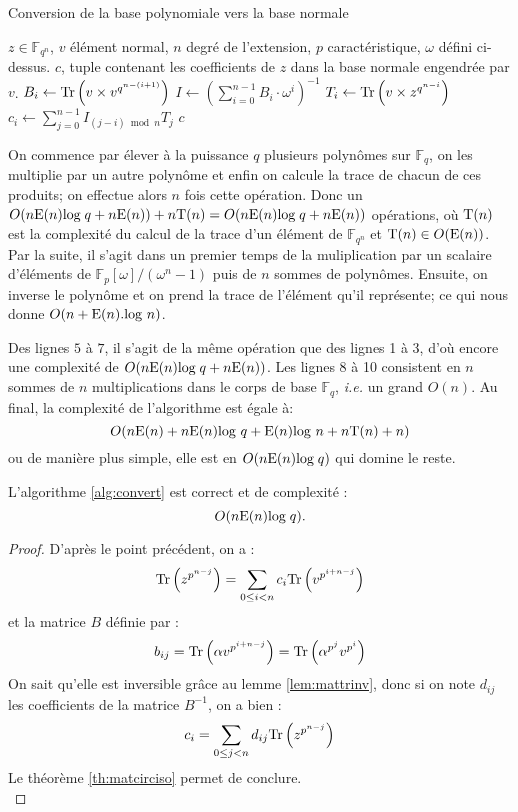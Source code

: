 \documentclass[a4paper]{article} %
\numberwithin{section}{part}
\numberwithin{equation}{section}
\newcommand\GF[1]{\mathbb{F}_{#1}}
\newcommand\Tr[1]{\textup{Tr}\left(#1\right)}
\newcommand\E[1]{\textup{E}(#1)}
\begin{document}
\begin{algorithm}
\caption{Conversion de la base polynomiale vers la base normale}
\label{alg:convert}
\begin{algorithmic}[1]
\REQUIRE $z\in\GF{q^n}$, $v$ élément normal, $n$ degré de l'extension, $p$ 
caractéristique, $\omega$ défini ci-dessus.
\ENSURE $c$, tuple contenant les coefficients de $z$ dans la base 
normale engendrée par $v$.
\bigskip
{}
    \STATE $B_i \leftarrow \Tr{v\times v^{q^{n-(i+1)}}}$
\ENDFOR
\STATE $I \leftarrow (\sum_{i = 0}^{n-1}{B_i\cdot \omega^i})^{-1}$
    \STATE $T_i \leftarrow \Tr{v\times z^{q^{n-i}}}$
\ENDFOR
{}
    \STATE $c_i \leftarrow \sum_{j=0}^{n-1}{I_{(j-i)\bmod n}T_j}$
\ENDFOR
\RETURN $c$

\end{algorithmic}
\end{algorithm}
On commence par élever à la puissance $q$ plusieurs polynômes sur $\GF{q}$, 
on les multiplie par un autre polynôme et enfin on calcule la trace de chacun 
de ces produits; on effectue alors $n$ fois cette opération. Donc un 
$O(n\E{n}\textup{log}\;q + n\E{n}) + n\textup{T}(n) = O(n\E{n}\textup{log}\;q + 
n\E{n})$ opérations, 
où $\textup{T}(n)$ est la complexité du calcul de la trace d'un élément
de $\GF{q^n}$ et $\textup{T}(n) \in O(\E{n})$.
Par la suite, il s'agit dans un premier temps de la muliplication par un 
scalaire d'éléments de $\mathbb{F}_p[\omega]/(\omega^n - 1)$ puis de $n$ sommes 
de polynômes. Ensuite, on inverse le polynôme et on prend la trace de l'élément 
qu'il représente; ce qui nous donne $O(n + \E{n}.\textup{log }n)$.\par
Des lignes $5$ à $7$, il s'agit de la même opération que des lignes 1 à 3, d'où 
encore une complexité de $O(n\E{n}\textup{log}\;q + n\E{n})$.
Les lignes 8 à 10 consistent en $n$ sommes de $n$ multiplications dans le corps 
de base $\GF{q}$, \textit{i.e.} un grand $O(n)$.
Au final, la complexité de l'algorithme est égale à:
\[O(n\E{n} + n\E{n}\textup{log }q +  \E{n}\textup{log }n + n\textup{T}(n) + n)\]
ou de manière plus simple, elle est en $O(n\E{n}\textup{log}\;q)$ qui domine le 
reste.

\begin{prop}
\label{prop:algconvert}
L'algorithme \ref{alg:convert} est correct et de complexité :
\begin{equation}
O(n\E{n}\textup{log}\;q).
\end{equation}
\end{prop}
\begin{proof}
D'après le point précédent, on a :
\[\textup{Tr}\left(z^{p^{n-j}}\right) = \sum_{0\leq i < n}{c_i\textup{Tr}
\left(v^{p^{i+n-j}}\right)}\]
et la matrice $B$ définie par :
\[b_{ij} = \Tr{\alpha v^{p^{i+n-j}}} = \Tr{\alpha^{p^j}v^{p^i}}\]
On sait qu'elle est inversible grâce au lemme \ref{lem:mattrinv}, donc si on
note $d_{ij}$ les coefficients de la matrice $B^{-1}$, on a bien :
\[c_i = \sum_{0\leq j < n}{d_{ij}\textup{Tr}\left(z^{p^{n-j}}\right)}\]
Le théorème \ref{th:matcirciso} permet de conclure.\\
\end{proof}
\end{document}
